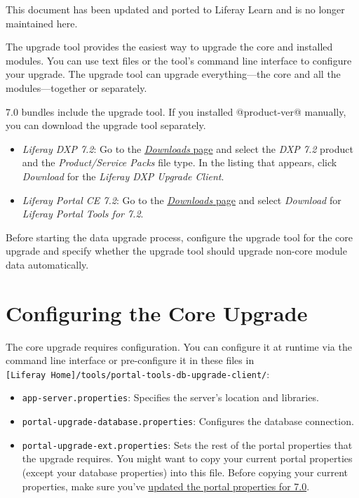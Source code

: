 {This document has been updated and ported to Liferay Learn and is no
longer maintained here.}

The upgrade tool provides the easiest way to upgrade the core and
installed modules. You can use text files or the tool's command line
interface to configure your upgrade. The upgrade tool can upgrade
everything---the core and all the modules---together or separately.

7.0 bundles include the upgrade tool. If you installed @product-ver@
manually, you can download the upgrade tool separately.

\begin{itemize}
\item
  \emph{Liferay DXP 7.2}: Go to the
  \href{https://customer.liferay.com/group/customer/downloads}{\emph{Downloads}
  page} and select the \emph{DXP 7.2} product and the
  \emph{Product/Service Packs} file type. In the listing that appears,
  click \emph{Download} for the \emph{Liferay DXP Upgrade Client}.
\item
  \emph{Liferay Portal CE 7.2}: Go to the
  \href{https://www.liferay.com/downloads-community}{\emph{Downloads}
  page} and select \emph{Download} for \emph{Liferay Portal Tools for
  7.2}.
\end{itemize}

Before starting the data upgrade process, configure the upgrade tool for
the core upgrade and specify whether the upgrade tool should upgrade
non-core module data automatically.

\section{Configuring the Core
Upgrade}\label{configuring-the-core-upgrade}

The core upgrade requires configuration. You can configure it at runtime
via the command line interface or pre-configure it in these files in
\texttt{{[}Liferay\ Home{]}/tools/portal-tools-db-upgrade-client/}:

\begin{itemize}
\tightlist
\item
  \texttt{app-server.properties}: Specifies the server's location and
  libraries.
\item
  \texttt{portal-upgrade-database.properties}: Configures the database
  connection.
\item
  \texttt{portal-upgrade-ext.properties}: Sets the rest of the portal
  properties that the upgrade requires. You might want to copy your
  current portal properties (except your database properties) into this
  file. Before copying your current properties, make sure you've
  \href{/docs/7-2/deploy/-/knowledge_base/d/preparing-to-upgrade-the-product-database}{updated
  the portal properties for 7.0}.
\end{itemize}

